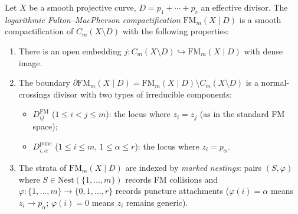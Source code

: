 \begin{definition}
\label{def:log-fm-compactification}
Let $X$ be a smooth projective curve, $D = p_1 + \cdots + p_r$ an
effective divisor.  The \emph{logarithmic Fulton--MacPherson
compactification} $\mathrm{FM}_m(X \mathbin{|} D)$ is a smooth
compactification of $C_m(X \setminus D)$ with the following
properties:
\begin{enumerate}
\item There is an open embedding
  $j\colon C_m(X \setminus D) \hookrightarrow
  \mathrm{FM}_m(X \mathbin{|} D)$
  with dense image.
\item The boundary $\partial \mathrm{FM}_m(X \mathbin{|} D)
  = \mathrm{FM}_m(X \mathbin{|} D) \setminus C_m(X \setminus D)$
  is a normal-crossings divisor with two types of irreducible
  components:
  \begin{itemize}
  \item $D_{ij}^{\mathrm{FM}}$ ($1 \leq i < j \leq m$):
    the locus where $z_i = z_j$ (as in the standard FM space);
  \item $D_{i,\alpha}^{\mathrm{punc}}$ ($1 \leq i \leq m$,
    $1 \leq \alpha \leq r$): the locus where $z_i = p_\alpha$.
  \end{itemize}
\item The strata of $\mathrm{FM}_m(X \mathbin{|} D)$ are indexed
  by \emph{marked nestings}: pairs $(S, \varphi)$ where
  $S \in \mathrm{Nest}(\{1, \ldots, m\})$ records FM collisions
  and $\varphi\colon \{1, \ldots, m\} \to \{0, 1, \ldots, r\}$
  records puncture attachments ($\varphi(i) = \alpha$ means
  $z_i \to p_\alpha$; $\varphi(i) = 0$ means $z_i$ remains generic).
\end{enumerate}
\end{definition}

